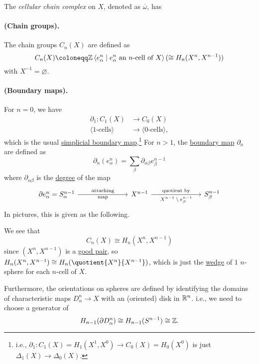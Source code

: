 \begin{definition}\label{def:cellular-chain-complex}
	The \emph{cellular chain complex} on \(X\), denoted as \(\overline{\omega}\), has
	\paragraph{(Chain groups).} The chain groups \(C_{n} (X)\) are defined as
	\[
		C_{n} (X) \coloneqq \mathbb{\MakeUppercase{z}} \left< e^n_\alpha \mid e^n_\alpha \text{ an \(n\)-cell of \(X\)}\right> (\cong H_n(X^n, X^{n-1}))
	\]
	with \(X^{-1} = \varnothing\).

	\paragraph{(Boundary maps).} For \(n=0\), we have
	\[
		\begin{split}
			\partial _1 \colon C_1(X)            & \to C_0(X)                       \\
			\langle \text{1-cells} \rangle & \to \langle \text{0-cells} \rangle,
		\end{split}
	\]
	which is the usual \hyperref[def:boundary-homomorphism]{simplicial boundary map}.\footnote{i.e.,
		\(\partial _1 \colon C_1(X)=H_1(X^1,X^0) \to C_0(X)=H_0(X^0)\) is just \(\Delta _1(X)\to \Delta _0(X)\).}
	For \(n > 1\), the \hyperref[def:boundary-homomorphism]{boundary map} \(\partial _{n}\) are defined as
	\[
		\partial _n(e_\alpha^n) = \sum_\beta \partial _{\alpha\beta} e_\beta^{n - 1}
	\]
	where \(\partial _{\alpha\beta}\) is the \hyperref[def:degree]{degree} of the map
	\[
		\begin{tikzcd}
			{\partial e^n_\alpha=S^{n-1}_{\alpha}} &&& {X^{n-1}} &&& {S^{n-1}_\beta}
			\arrow["{\text{attaching}}", "{\text{map}}"', from=1-1, to=1-4]
			\arrow["{\text{quotient by}}", "{\text{\(X^{n-1} \setminus e^{n-1}_\beta\)}}"', from=1-4, to=1-7]
		\end{tikzcd}
	\]
	In pictures, this is given as the following.
	\begin{figure}[H]
		\centering
		\label{fig:cellular-boundary-map}
	\end{figure}
\end{definition}
\begin{remark}
	We see that
	\[
		C_{n} (X) \cong H_{n} (X^n, X^{n-1})
	\]
	since \((X^n, X^{n-1})\) is a \hyperref[def:good-pair]{good pair}, so \(H_{n} (X^n, X^{n-1}) \cong H_n(\quotient{X^n}{X^{n-1}})\), which is
	just the \hyperref[CW-complex-wedge-sum]{wedge} of \(1\) \(n\)-sphere for each \(n\)-cell of \(X\).

	Furthermore, the orientations on spheres are defined by identifying the domains of characteristic maps 	\(D^n_\alpha \to X\) with an (oriented) disk in
	\(\mathbb{\MakeUppercase{r}} ^n\). i.e., we need to choose a generator of
	\[
		H_{n-1}(\partial D^n_\alpha) \cong H_{n-1}(S^{n-1})\cong \mathbb{\MakeUppercase{z}}.
	\]
\end{remark}
